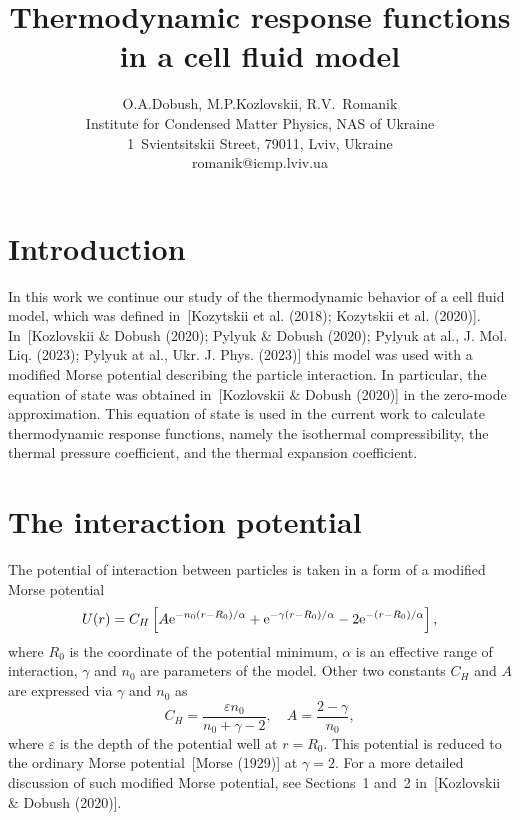 \documentclass[12pt]{article}
\title{Thermodynamic response functions in a cell fluid model}
\author{O.A.Dobush, M.P.Kozlovskii, R.V.~Romanik
	\\ \small Institute for Condensed Matter Physics, NAS of Ukraine 
	\\ \small 1~Svientsitskii Street, 79011, Lviv, Ukraine 
	\\ \small romanik@icmp.lviv.ua}
\begin{document}
	
	\maketitle
	
	
	\section{Introduction}
	
	In this work we continue our study of the thermodynamic behavior of a cell fluid model, which was defined in~[Kozytskii et al. (2018); Kozytskii et al. (2020)]. In~[Kozlovskii $\&$ Dobush (2020); Pylyuk $\&$ Dobush (2020); Pylyuk at al., J. Mol. Liq. (2023); Pylyuk at al., Ukr. J. Phys. (2023)] this model was used with a modified Morse potential describing the particle interaction. In particular, the equation of state was obtained in~[Kozlovskii $\&$ Dobush (2020)] in the zero-mode approximation. This equation of state is used in the current work to calculate thermodynamic response functions, namely the isothermal compressibility, the thermal pressure coefficient, and the thermal expansion coefficient.
	
	\section{The interaction potential}
	The potential of interaction between particles is taken in a form of a modified Morse potential
	\begin{equation}
		U(r) = C_{H} \left[A {\rm e}^{-n_0(r-R_0)/\alpha} + {\rm e}^{-\gamma(r - R_0)/\alpha} -2{\rm e}^{-(r-R_0)/\alpha}\right],
	\end{equation}
	where $R_0$ is the coordinate of the potential minimum, $\alpha$ is an effective range of interaction, $\gamma$ and $n_0$ are parameters of the model. Other two constants $C_{H}$ and $A$ are expressed via $\gamma$ and $n_0$ as
	\begin{equation}
		C_{H} = \frac{\varepsilon n_0}{n_0 + \gamma - 2}, \quad A = \frac{2 - \gamma}{n_0},
	\end{equation}
	where $\varepsilon$ is the depth of the potential well at $r=R_0$. This potential is reduced to the ordinary Morse potential~[Morse (1929)] at $\gamma=2$. For a more detailed discussion of such modified Morse potential, see Sections~1 and~2 in~[Kozlovskii $\&$ Dobush (2020)].
	
\end{document}
